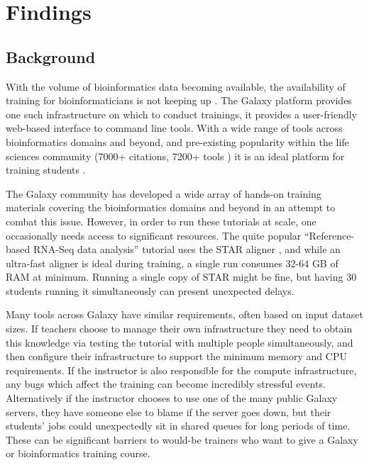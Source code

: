 \documentclass[a4paper,num-refs]{oup-contemporary}
\begin{document}
\section{Findings}
\subsection{Background}


With the volume of bioinformatics data becoming available, the availability of training for bioinformaticians is not keeping up \cite{Attwood2017}.
The Galaxy platform \cite{afgan2018galaxy} provides one such infrastructure on which to conduct trainings, it provides a user-friendly web-based interface to command line tools. With a wide range of tools across bioinformatics domains and beyond, and pre-existing popularity within the life sciences community (7000+ citations, 7200+ tools \cite{galaxycitations,galaxytoolshed}) it is an ideal platform for training students \cite{gtn}.

The Galaxy community has developed a wide array of hands-on training materials covering the bioinformatics domains and beyond \cite{training-site} in an attempt to combat this issue. However, in order to run these tutorials at scale, one occasionally needs access to significant resources. The quite popular ``Reference-based RNA-Seq data analysis'' tutorial uses the STAR aligner \cite{Dobin2012}, and while an ultra-fast aligner is ideal during training, a single run consumes 32-64 GB of RAM at minimum. Running a single copy of STAR might be fine, but having 30 students running it simultaneously can present unexpected delays.

Many tools across Galaxy have similar requirements, often based on input dataset sizes. If teachers choose to manage their own infrastructure they need to obtain this knowledge via testing the tutorial with multiple people simultaneously, and then configure their infrastructure to support the minimum memory and CPU requirements. If the instructor is also responsible for the compute infrastructure, any bugs which affect the training can become incredibly stressful events. Alternatively if the instructor chooses to use one of the many public Galaxy servers, they have someone else to blame if the server goes down, but their students' jobs could unexpectedly sit in shared queues for long periods of time. These can be significant barriers to would-be trainers who want to give a Galaxy or bioinformatics training course.
\end{document}
